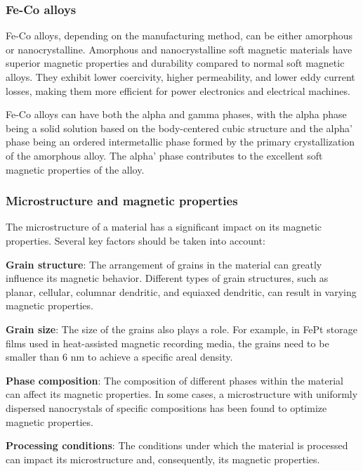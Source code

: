 \subsubsection{Fe-Co alloys}

Fe-Co alloys, depending on the manufacturing method, can be either amorphous or nanocrystalline. Amorphous and nanocrystalline soft magnetic materials have superior magnetic properties and durability compared to normal soft magnetic alloys. They exhibit lower coercivity, higher permeability, and lower eddy current losses, making them more efficient for power electronics and electrical machines.

Fe-Co alloys can have both the alpha and gamma phases, with the alpha phase being a solid solution based on the body-centered cubic structure and the alpha' phase being an ordered intermetallic phase formed by the primary crystallization of the amorphous alloy. The alpha' phase contributes to the excellent soft magnetic properties of the alloy.

\subsubsection{Microstructure and magnetic properties}

The microstructure of a material has a significant impact on its magnetic properties. Several key factors should be taken into account:

\textbf{Grain structure}: The arrangement of grains in the material can greatly influence its magnetic behavior. Different types of grain structures, such as planar, cellular, columnar dendritic, and equiaxed dendritic, can result in varying magnetic properties. \cite{Xing_Dong_Zhou_Cui_Wang_2023} \cite{Willard_Franco_2013} 

\textbf{Grain size}: The size of the grains also plays a role. For example, in FePt storage films used in heat-assisted magnetic recording media, the grains need to be smaller than 6 nm to achieve a specific areal density. \cite{Zhang_Kalitsov_Ciston_Mryasov_Ozdol_Zhu_Jain_Zhang_Livshitz_Chernyshov_et_al._2018}

\textbf{Phase composition}: The composition of different phases within the material can affect its magnetic properties. In some cases, a microstructure with uniformly dispersed nanocrystals of specific compositions has been found to optimize magnetic properties. \cite{Tan_Li_Xu_Han_Li_Zhang_2017}

\textbf{Processing conditions}: The conditions under which the material is processed can impact its microstructure and, consequently, its magnetic properties. \cite{Willard_Franco_2013}

